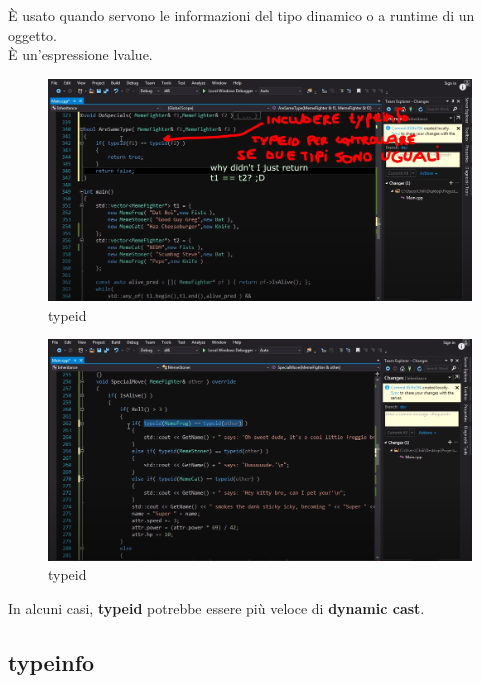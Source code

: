 \textsf{\small È usato quando servono le informazioni del tipo dinamico o a runtime di un oggetto.} \\
\textsf{\small È un'espressione lvalue.} \\

\begin{figure}[H]
	\centering
	\includegraphics[width=1.2\textwidth, height=1.2\textheight, keepaspectratio]{./imgs/typeinfo_typeid.png}
	\caption{typeid}
	\label{fig:typeinfo_typeid}
\end{figure}

\begin{figure}[H]
	\centering
	\includegraphics[width=1.2\textwidth, height=1.2\textheight, keepaspectratio]{./imgs/typeinfo_typeid_if.png}
	\caption{typeid}
	\label{fig:typeinfo_typeid_if}
\end{figure}

\textsf{\small In alcuni casi, \textbf{typeid} potrebbe essere più veloce di \textbf{dynamic cast}.} \\

\subsection{typeinfo}

